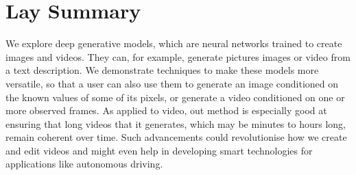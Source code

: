

\chapter{Lay Summary}


We explore deep generative models, which are neural networks trained to create images and videos. They can, for example, generate pictures images or video from a text description. We demonstrate techniques to make these models more versatile, so that a user can also use them to generate an image conditioned on the known values of some of its pixels, or generate a video conditioned on one or more observed frames. As applied to video, out method is especially good at ensuring that long videos that it generates, which may be minutes to hours long, remain coherent over time. Such advancements could revolutionise how we create and edit videos and might even help in developing smart technologies for applications like autonomous driving.


\endinput

